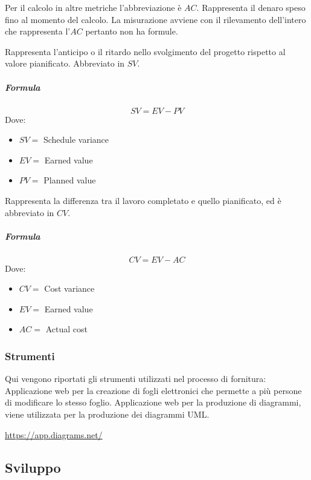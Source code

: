         Per il calcolo in altre metriche l'abbreviazione è $AC$.
        Rappresenta il denaro speso fino al momento del calcolo.
         La misurazione avviene con il rilevamento dell'intero che rappresenta l'$AC$ pertanto non ha formule.
        
        Rappresenta l'anticipo o il ritardo nello svolgimento del progetto rispetto al valore pianificato. Abbreviato in $SV$.
        \subparagraph{Formula}
        \begin{displaymath}
          SV = EV - PV
        \end{displaymath}
        Dove:
        \begin{itemize}
            \item[] $SV =$ Schedule variance
            \item[] $EV =$ Earned value
            \item[] $PV =$ Planned value
        \end{itemize}
        
        Rappresenta la differenza tra il lavoro completato e quello pianificato, ed è abbreviato in $CV$.
        \subparagraph{Formula}
        \begin{displaymath}
          CV = EV - AC
        \end{displaymath}
        Dove:
        \begin{itemize}
            \item[] $CV =$ Cost variance
            \item[] $EV =$ Earned value
            \item[] $AC =$ Actual cost
        \end{itemize}
        
		\subsubsection{Strumenti}
	    Qui vengono riportati gli strumenti utilizzati nel processo di fornitura:
	    Applicazione web per la creazione di fogli elettronici che permette a più persone di modificare lo stesso foglio.
	    Applicazione web per la produzione di diagrammi, viene utilizzata per la produzione dei diagrammi UML.\\
	    \centerline{\url{https://app.diagrams.net/}}
			
		\subsection{Sviluppo}
